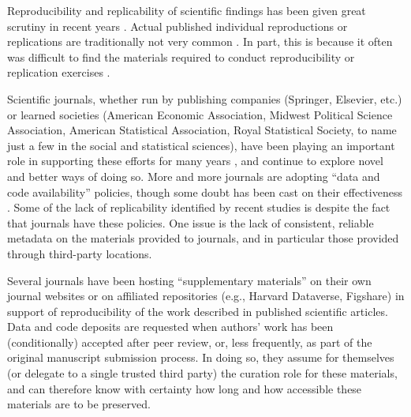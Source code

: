 Reproducibility and replicability of scientific findings has been given great scrutiny in recent years \parencite{CamererEvaluatingreplicabilitylaboratory2016,Collaboration2015-ev,Klein2014,FanelliOpinionsciencereally2018}.
%
Actual published individual reproductions or replications are traditionally not very common \parencite[in economics, see][]{BellMiller2013b,Duvendack2017}. In part, this is because it often was difficult to find the materials required to conduct reproducibility or replication exercises \parencite{Dewald1986,McCullough2006,McCullough03}.  

Scientific journals, whether run by publishing companies (Springer, Elsevier, etc.) or learned societies (American Economic Association, Midwest Political Science Association, American Statistical Association, Royal Statistical Society, to name just a few in the social and statistical sciences), have been playing an important role in supporting these efforts for many years \parencite{stodden_enhancing_2016}, and continue to explore novel and better ways of doing so. More and more journals are adopting ``data and code availability'' policies, though some doubt has been cast on their effectiveness \parencite{stodden_toward_2013,Stoddenempiricalanalysisjournal2018,Hoeffler2017}. Some of the lack of replicability identified by recent studies \parencite{Hoeffler2017a,Chang2017,ChangLi2015,CamererEvaluatingreplicabilitylaboratory2016,Stoddenempiricalanalysisjournal2018}  is despite the fact that journals have these policies. One issue is the lack of consistent, reliable metadata on the materials provided to journals, and in particular those provided through third-party locations.

Several journals have been hosting ``supplementary materials'' on their own journal websites or on affiliated repositories (e.g., Harvard Dataverse, Figshare) in support of reproducibility of the work described in published scientific articles. Data and code deposits are requested when authors' work has been (conditionally) accepted after peer review, or, less frequently, as part of the original manuscript submission process. In doing so, they assume for themselves (or delegate to a single trusted third party) the curation role for these materials, and can therefore know with certainty how long and how accessible these materials are to be preserved.

